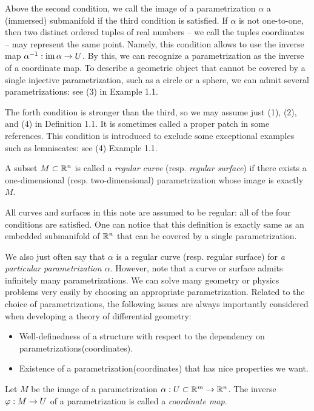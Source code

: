 \documentclass{../exp}
\def\a{\alpha}
\begin{document}
Above the second condition, we call the image of a parametrization $\a$ a (immersed) submanifold if the third condition is satisfied.
If $\a$ is not one-to-one, then two distinct ordered tuples of real numbers -- we call the tuples coordinates -- may represent the same point.
Namely, this condition allows to use the inverse map $\a^{-1}:\im\a\to U$.
By this, we can recognize a parametrization as the inverse of a coordinate map.
To describe a geometric object that cannot be covered by a single injective parametrization, such as a circle or a sphere, we can admit several parametrizations: see (3) in Example 1.1.

The forth condition is stronger than the third, so we may assume just (1), (2), and (4) in Definition 1.1.
It is sometimes called a proper patch in some references.
This condition is introduced to exclude some exceptional examples such as lemniscates: see (4) Example 1.1.

\begin{defn}
A subset $M\subset\mathbb{R}^n$ is called a \emph{regular curve} (resp. \emph{regular surface}) if there exists a one-dimensional (resp. two-dimensional) parametrization whose image is exactly $M$.
\end{defn}

All curves and surfaces in this note are assumed to be regular: all of the four conditions are satisfied.
One can notice that this definition is exactly same as an embedded submanifold of $\mathbb{R}^n$ that can be covered by a single parametrization.

We also just often say that $\a$ is a regular curve (resp. regular surface) for \emph{a particular parametrization $\a$}.
However, note that a curve or surface admits infinitely many parametrizations.
We can solve many geometry or physics problems very easily by choosing an appropriate parametrization.
Related to the choice of parametrizations, the following issues are always importantly considered when developing a theory of differential geometry:
\begin{itemize}
\item Well-definedness of a structure with respect to the dependency on parametrizations(coordinates).
\item Existence of a parametrization(coordinates) that has nice properties we want.
\end{itemize}

\begin{defn}
Let $M$ be the image of a parametrization $\a:U\subset\R^m\to\R^n$.
The inverse $\f:M\to U$ of a parametrization is called a \emph{coordinate map}.
\end{defn}
\end{document}
